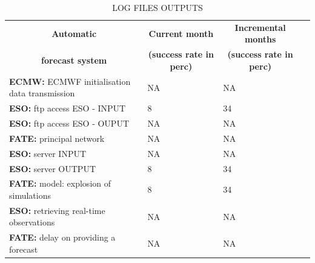 \documentclass[11pt,english]{article}
\newcommand{\HRule}{\rule{\linewidth}{0.5mm}}
\begin{document}
\clearpage
\begin{table}[]
\begin{center}
\begin{tabular}{|l|l|l|l|}
\hline
\multicolumn{1}{|c|}{\cellcolor[HTML]{C0C0C0}\textbf{Automatic}} & \multicolumn{1}{c|}{\cellcolor[HTML]{C0C0C0}\textbf{Current month}} & \multicolumn{1}{c|}{\cellcolor[HTML]{C0C0C0}\textbf{Incremental months}} \\
\multicolumn{1}{|c|}{\cellcolor[HTML]{C0C0C0}\textbf{forecast system}} & \multicolumn{1}{c|}{\cellcolor[HTML]{C0C0C0}\textbf{(success rate in perc)}} & \multicolumn{1}{c|}{\cellcolor[HTML]{C0C0C0}\textbf{(success rate in perc)}} \\
\hline
\cellcolor[HTML]{C0C0C0}\textbf{ECMW:} ECMWF initialisation data transmission  & NA           & NA    \\
\cellcolor[HTML]{C0C0C0}\textbf{ESO:} ftp access ESO - INPUT                   & 8           & 34   \\
\cellcolor[HTML]{C0C0C0}\textbf{ESO:} ftp access ESO - OUPUT                   & NA           & NA   \\
\cellcolor[HTML]{C0C0C0}\textbf{FATE:} principal network                       & NA           & NA   \\
\cellcolor[HTML]{C0C0C0}\textbf{ESO:} server INPUT                             & NA           & NA   \\
\cellcolor[HTML]{C0C0C0}\textbf{ESO:} server OUTPUT                            & 8           & 34   \\
\cellcolor[HTML]{C0C0C0}\textbf{FATE:} model: explosion of simulations         & 8           & 34   \\
\cellcolor[HTML]{C0C0C0}\textbf{ESO:} retrieving real-time observations        & NA           & NA   \\
\cellcolor[HTML]{C0C0C0}\textbf{FATE:} delay on providing a forecast           & NA           & NA   \\
\hline
\end{tabular}
\caption{LOG FILES OUTPUTS}
\end{center}
\end{table}

\clearpage
\end{document}
